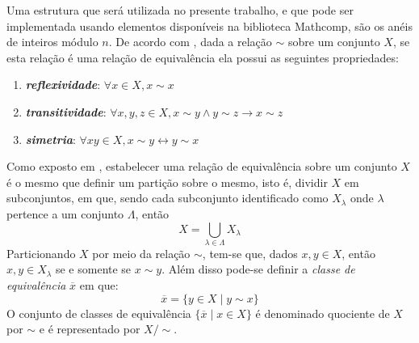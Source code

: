 Uma estrutura que será utilizada no presente trabalho, e que pode ser implementada usando elementos disponíveis na biblioteca Mathcomp, são os anéis de inteiros módulo $n$. De acordo com \cite[p.~40]{book:2399854}, dada a relação $\sim$ sobre um conjunto $X$, se esta relação é uma relação de equivalência ela possui as seguintes propriedades:
\begin{enumerate}
    \item \textbf{\textit{reflexividade}}: $\forall x \in X, x \sim x$
    \item \textbf{\textit{transitividade}}: $\forall x, y, z \in X, x \sim y \land y \sim z \rightarrow x \sim z$
    \item \textbf{\textit{simetria}}: $\forall x y \in X, x \sim y \leftrightarrow y \sim x$
\end{enumerate}
Como exposto em \cite[p.~40-41]{book:2399854}, estabelecer uma relação de equivalência sobre um conjunto $X$ é o mesmo que definir um partição sobre o mesmo, isto é, dividir $X$ em subconjuntos, em que, sendo cada subconjunto identificado como $X_\lambda$ onde $\lambda$ pertence a um conjunto $\Lambda$, então
\begin{equation*}
    X = \bigcup_{\lambda \in \Lambda} X_{\lambda}
\end{equation*}
Particionando $X$ por meio da relação $\sim$, tem-se que, dados $x, y \in X$, então $x, y \in X_\lambda$ se e somente se $x \sim y$. Além disso pode-se definir a \textit{classe de equivalência} $\overline{x}$ em que:
\begin{equation*}
    \overline{x} = \{y \in X \mid y \sim x \}
\end{equation*}
O conjunto de classes de equivalência $\{\overline{x} \mid x \in X\}$ é denominado quociente de $X$ por $\sim$ e é representado por $X/\sim$.

